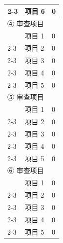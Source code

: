 \documentclass[UTF8,10pt,a4paper,fontset=fandol]{ctexart}
\newcommand{\fieldvalue}[1]{#1}
\newcommand{\handwritten}[1]{#1}
\begin{document}
\begin{tabularx}{\textwidth}{|p{}|X|p{}|}
\\
\cline{2-3}
 & 项目 6 &
\fieldvalue{\handwritten{0}}
\\
\hline
\multicolumn{3}{|l|}{④ \quad 审查项目} \\
\hline
 & 项目 1 &
\fieldvalue{\handwritten{0}}
\\
\cline{2-3}
 & 项目 2 &
\fieldvalue{\handwritten{0}}
\\
\cline{2-3}
 & 项目 3 &
\fieldvalue{\handwritten{0}}
\\
\cline{2-3}
 & 项目 4 &
\fieldvalue{\handwritten{0}}
\\
\cline{2-3}
 & 项目 5 &
\fieldvalue{\handwritten{0}}
\\
\hline
\multicolumn{3}{|l|}{⑤ \quad 审查项目} \\
\hline
 & 项目 1 &
\fieldvalue{\handwritten{0}}
\\
\cline{2-3}
 & 项目 2 &
\fieldvalue{\handwritten{0}}
\\
\cline{2-3}
 & 项目 3 &
\fieldvalue{\handwritten{0}}
\\
\cline{2-3}
 & 项目 4 &
\fieldvalue{\handwritten{0}}
\\
\cline{2-3}
 & 项目 5 &
\fieldvalue{\handwritten{0}}
\\
\hline
\multicolumn{3}{|l|}{⑥ \quad 审查项目} \\
\hline
 & 项目 1 &
\fieldvalue{\handwritten{0}}
\\
\cline{2-3}
 & 项目 2 &
\fieldvalue{\handwritten{0}}
\\
\cline{2-3}
 & 项目 3 &
\fieldvalue{\handwritten{0}}
\\
\cline{2-3}
 & 项目 4 &
\fieldvalue{\handwritten{0}}
\\
\cline{2-3}
 & 项目 5 &
\fieldvalue{\handwritten{0}}
\\
\hline
\end{tabularx}
\end{document}
